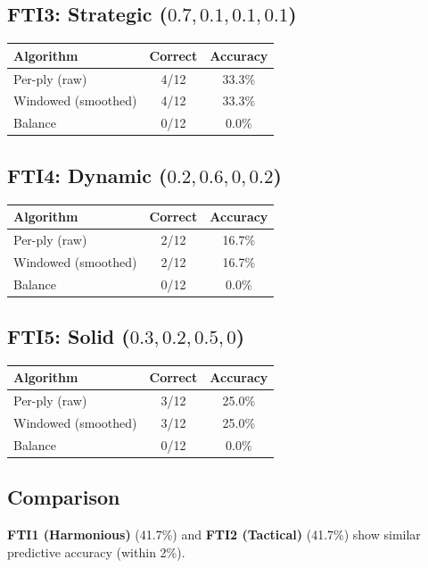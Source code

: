 \documentclass[11pt]{book}
\begin{document}
\subsection{FTI3: Strategic ($0.7, 0.1, 0.1, 0.1$)}

\begin{tabular}{lcc}
\toprule
\textbf{Algorithm} & \textbf{Correct} & \textbf{Accuracy} \\
\midrule
Per-ply (raw) & 4/12 & 33.3\% \\
Windowed (smoothed) & 4/12 & 33.3\% \\
Balance & 0/12 & 0.0\% \\
\bottomrule
\end{tabular}

\subsection{FTI4: Dynamic ($0.2, 0.6, 0, 0.2$)}

\begin{tabular}{lcc}
\toprule
\textbf{Algorithm} & \textbf{Correct} & \textbf{Accuracy} \\
\midrule
Per-ply (raw) & 2/12 & 16.7\% \\
Windowed (smoothed) & 2/12 & 16.7\% \\
Balance & 0/12 & 0.0\% \\
\bottomrule
\end{tabular}

\subsection{FTI5: Solid ($0.3, 0.2, 0.5, 0$)}

\begin{tabular}{lcc}
\toprule
\textbf{Algorithm} & \textbf{Correct} & \textbf{Accuracy} \\
\midrule
Per-ply (raw) & 3/12 & 25.0\% \\
Windowed (smoothed) & 3/12 & 25.0\% \\
Balance & 0/12 & 0.0\% \\
\bottomrule
\end{tabular}

\subsection{Comparison}

\textbf{FTI1 (Harmonious)} (41.7\%) and \textbf{FTI2 (Tactical)} (41.7\%) show similar predictive accuracy (within 2\%).
\end{document}
